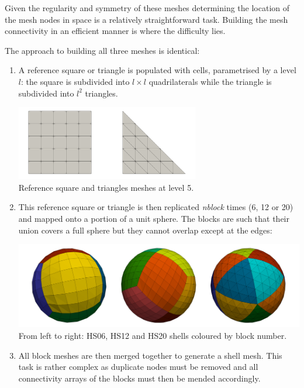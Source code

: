Given the regularity and symmetry of these meshes determining the location of the 
mesh nodes in space is a relatively straightforward task. Building the mesh connectivity in an 
efficient manner is where the difficulty lies.

The approach to building all three meshes is identical:
\begin{enumerate}
\item A reference square or triangle is populated with cells,
parametrised by a level $l$: the square is subdivided into $l\times l$ quadrilaterals while 
the triangle is subdivided into $l^2$ triangles.
\begin{center}
\includegraphics[width=8cm]{images/ghost/f01_basics}\\
{\captionfont Reference square and triangles meshes at level 5.}
\end{center}

\item This reference square or triangle is then replicated {\sl nblock} times (6, 12 or 20) and mapped
onto a portion of a unit sphere. The blocks are such that their union covers a full sphere
but they cannot overlap except at the edges:
\begin{center}
\includegraphics[width=.9\linewidth]{images/ghost/f02}\\
{\captionfont From left to right: HS06, HS12 and HS20 shells coloured by block number.}
\end{center}

\item All block meshes are then merged together to generate a shell mesh. This task is rather 
complex as duplicate nodes must be removed and all connectivity arrays of the blocks must then 
be mended accordingly. 


\end{enumerate}
